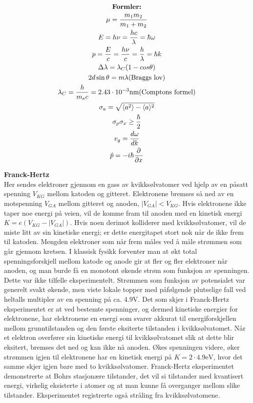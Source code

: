 \documentclass[8pt, A4paper, norsk]{extarticle}
\begin{document}
\begin{multicols*}{3}
		\begin{gather*}
\text{\textbf{Formler:}} \\
\mu = \frac{m_1 m_2}{m_1 + m_2} \\
E = h \nu = \frac{h c}{\lambda} = \hbar \omega \\
p = \frac{E}{c} = \frac{h \nu}{c} = \frac{h}{\lambda} = \hbar k \\
\Delta \lambda = \lambda_C (1 - cos \theta) \\
2d \sin \theta = m \lambda (\text{Braggs lov}) \\
\lambda_C = \frac{h}{m_e c} = 2.43 \cdot 10^{-3} \text{nm} (\text{Comptons formel}) \\
\sigma_a = \sqrt{\langle a^2 \rangle - \langle a \rangle^2} \\
\sigma_p \sigma_x \geq \frac{\hbar}{2} \\
v_g = \frac{d \omega}{dk} \\
\hat{p} = - i \hbar \frac{\partial}{\partial x}
		\end{gather*}

\centering \textbf{Franck-Hertz} \\
Her sendes elektroner gjennom en gass av kvikksølvatomer ved hjelp av en påsatt spenning $V_{KG}$ mellom katoden og gitteret. Elektronene bremses så ned av en motspenning $V_{GA}$ mellom gitteret og anoden, $|V_{GA}| < V_{KG}$. Hvis elektronene ikke taper noe energi på veien, vil de komme fram til anoden med en kinetisk energi $K = e(V_{KG} - |V_{GA}|)$. Hvis noen derimot kolliderer med kvikksølvatomer, vil de miste litt av sin kinetiske energi; er dette energitapet stort nok når de ikke frem til katoden. Mengden elektroner som når frem måles ved å måle strømmen som går gjennom kretsen. I klassisk fysikk forventer man at økt total spenningsforskjell mellom katode og anode gir at fler og fler elektroner når anoden, og man burde få en monotont økende strøm som funksjon av spenningen. Dette var ikke tilfelle eksperimentelt. Strømmen som funksjon av potensialet var generelt svakt økende, men viste lokale topper med påfølgende plutselige fall ved heltalls multipler av en spenning på ca. $4.9 \text{V}$. 
Det som skjer i Franck-Hertz eksperimentet er at ved bestemte spenninger, og dermed kinetiske energier for elektronene, har elektronene en energi som svarer akkurat til energiforskjellen mellom grunntilstanden og den første eksiterte tilstanden i kvikksølvatomet. Når et elektron overfører sin kinetiske energi til kvikksølvatomet slik at dette blir eksitert, bremses det ned og kan ikke nå anoden. Økes spenningen videre, øker strømmen igjen til elektronene har en kinetisk energi på $K = 2 \cdot 4.9 \text{eV}$, hvor det samme skjer igjen bare med to kvikksølvatomer.
Franck-Hertz eksperimentet demonstrerte at Bohrs stasjonære tilstander, det vil si tilstander med kvantisert energi, virkelig eksisterte i atomer og at man kunne få overganger mellom slike tilstander. Eksperimentet registrerte også stråling fra kvikksølvatomene. \\


\end{multicols*}
\end{document}
